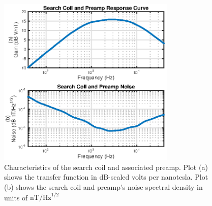 \begin{figure}[t]
\begin{center}
\includegraphics[width=20pc]{figures/vpm_figures/searchcoil_response_2up.eps}
\caption[Characteristics of the search coil and associated preamp]{Characteristics of the search coil and associated preamp. Plot (a) shows the transfer function in dB-scaled volts per nanotesla. Plot (b) shows the search coil and preamp's noise spectral density in units of $\mathrm{nT/Hz}^{1/2}$}
\label{fig:searchcoil}
\end{center}
\end{figure}


